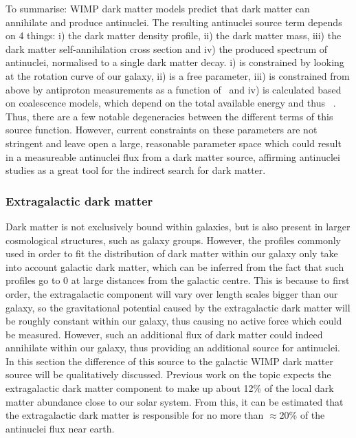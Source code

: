 To summarise: WIMP dark matter models predict that dark matter can annihilate and produce antinuclei. The resulting antinuclei source term depends on 4 things: i) the dark matter density profile, ii) the dark matter mass, iii) the dark matter self-annihilation cross section and iv) the produced spectrum of antinuclei, normalised to a single dark matter decay. i) is constrained by looking at the rotation curve of our galaxy, ii) is a free parameter, iii) is constrained from above by antiproton measurements as a function of \dmm\ and iv) is calculated based on coalescence models, which depend on the total available energy and thus \dmm\ . Thus, there are a few notable degeneracies between the different terms of this source function. However, current constraints on these parameters are not stringent and leave open a large, reasonable parameter space which could result in a measureable antinuclei flux from a dark matter source, affirming antinuclei studies as a great tool for the indirect search for dark matter.



\subsubsection{Extragalactic dark matter}
Dark matter is not exclusively bound within galaxies, but is also present in larger cosmological structures, such as galaxy groups\cite{}. However, the profiles commonly used in order to fit the distribution of dark matter within our galaxy only take into account galactic dark matter, which can be inferred from the fact that such profiles go to 0 at large distances from the galactic centre. This is because to first order, the extragalactic component will vary over length scales bigger than our galaxy, so the gravitational potential caused by the extragalactic dark matter will be roughly constant within our galaxy, thus causing no active force which could be measured. However, such an additional flux of dark matter could indeed annihilate within our galaxy, thus providing an additional source for antinuclei. In this section the difference of this source to the galactic WIMP dark matter source will be qualitatively discussed. Previous work on the topic expects the extragalactic dark matter component to make up about 12\% of the local dark matter abundance close to our solar system\cite{}. From this, it can be estimated that the extragalactic dark matter is responsible for no more than $\approx 20$\% of the antinuclei flux near earth. \\ 

